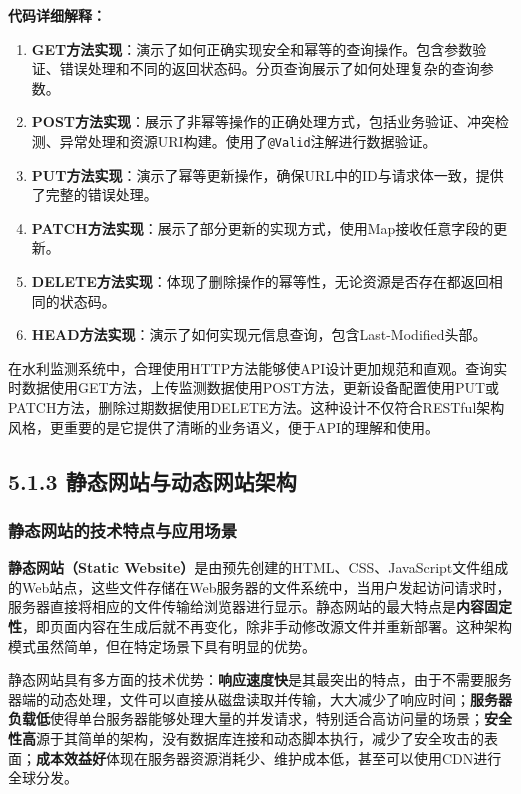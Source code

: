 \textbf{代码详细解释：}

\begin{enumerate}
\def\labelenumi{\arabic{enumi}.}
\item
  \textbf{GET方法实现}：演示了如何正确实现安全和幂等的查询操作。包含参数验证、错误处理和不同的返回状态码。分页查询展示了如何处理复杂的查询参数。
\item
  \textbf{POST方法实现}：展示了非幂等操作的正确处理方式，包括业务验证、冲突检测、异常处理和资源URI构建。使用了\texttt{@Valid}注解进行数据验证。
\item
  \textbf{PUT方法实现}：演示了幂等更新操作，确保URL中的ID与请求体一致，提供了完整的错误处理。
\item
  \textbf{PATCH方法实现}：展示了部分更新的实现方式，使用Map接收任意字段的更新。
\item
  \textbf{DELETE方法实现}：体现了删除操作的幂等性，无论资源是否存在都返回相同的状态码。
\item
  \textbf{HEAD方法实现}：演示了如何实现元信息查询，包含Last-Modified头部。
\end{enumerate}

在水利监测系统中，合理使用HTTP方法能够使API设计更加规范和直观。查询实时数据使用GET方法，上传监测数据使用POST方法，更新设备配置使用PUT或PATCH方法，删除过期数据使用DELETE方法。这种设计不仅符合RESTful架构风格，更重要的是它提供了清晰的业务语义，便于API的理解和使用。

\subsection{5.1.3 静态网站与动态网站架构}\label{ux9759ux6001ux7f51ux7ad9ux4e0eux52a8ux6001ux7f51ux7ad9ux67b6ux6784}

\subsubsection{静态网站的技术特点与应用场景}\label{ux9759ux6001ux7f51ux7ad9ux7684ux6280ux672fux7279ux70b9ux4e0eux5e94ux7528ux573aux666f}

\textbf{静态网站（Static Website）}是由预先创建的HTML、CSS、JavaScript文件组成的Web站点，这些文件存储在Web服务器的文件系统中，当用户发起访问请求时，服务器直接将相应的文件传输给浏览器进行显示。静态网站的最大特点是\textbf{内容固定性}，即页面内容在生成后就不再变化，除非手动修改源文件并重新部署。这种架构模式虽然简单，但在特定场景下具有明显的优势。

静态网站具有多方面的技术优势：\textbf{响应速度快}是其最突出的特点，由于不需要服务器端的动态处理，文件可以直接从磁盘读取并传输，大大减少了响应时间；\textbf{服务器负载低}使得单台服务器能够处理大量的并发请求，特别适合高访问量的场景；\textbf{安全性高}源于其简单的架构，没有数据库连接和动态脚本执行，减少了安全攻击的表面；\textbf{成本效益好}体现在服务器资源消耗少、维护成本低，甚至可以使用CDN进行全球分发。

